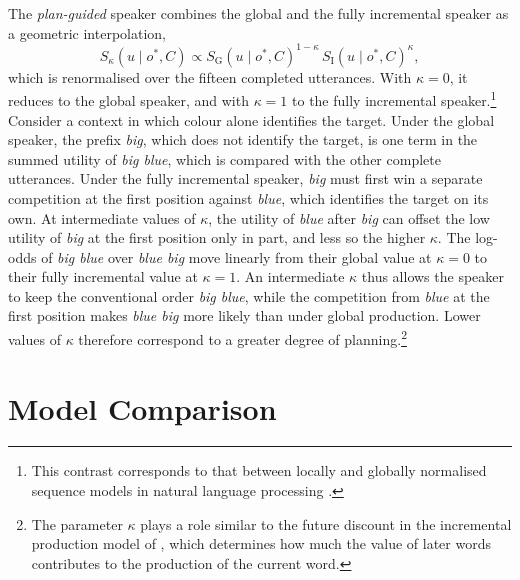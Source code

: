 \documentclass[10pt,a4paper,fleqn]{article}
\begin{document}
The \emph{plan-guided} speaker combines the global and the fully incremental speaker as a geometric interpolation,
\begin{equation}
  S_{\kappa}(u\mid o^*,C)
  \propto
  S_{\mathrm{G}}(u\mid o^*,C)^{1-\kappa}\,
  S_{\mathrm{I}}(u\mid o^*,C)^{\kappa},
  \label{eq:plan-guided-speaker}
\end{equation}
which is renormalised over the fifteen completed utterances.
With $\kappa=0$, it reduces to the global speaker, and with $\kappa=1$ to the fully incremental speaker.\footnote{This contrast corresponds to that between locally and globally normalised sequence models in natural language processing \citep{lafferty2001conditional,andor2016globally}.}
Consider a context in which colour alone identifies the target.
Under the global speaker, the prefix \emph{big}, which does not identify the target, is one term in the summed utility of \emph{big blue}, which is compared with the other complete utterances.
Under the fully incremental speaker, \emph{big} must first win a separate competition at the first position against \emph{blue}, which identifies the target on its own.
At intermediate values of $\kappa$, the utility of \emph{blue} after \emph{big} can offset the low utility of \emph{big} at the first position only in part, and less so the higher $\kappa$.
The log-odds of \emph{big blue} over \emph{blue big} move linearly from their global value at $\kappa=0$ to their fully incremental value at $\kappa=1$.
An intermediate $\kappa$ thus allows the speaker to keep the conventional order \emph{big blue}, while the competition from \emph{blue} at the first position makes \emph{blue big} more likely than under global production.
Lower values of $\kappa$ therefore correspond to a greater degree of planning.\footnote{The parameter $\kappa$ plays a role similar to the future discount in the incremental production model of \citet{futrell2023information}, which determines how much the value of later words contributes to the production of the current word.}

\section{Model Comparison}
\label{sec:experiments}
\label{sec:modelcomparison}
\label{sec:model:extended}
\end{document}
